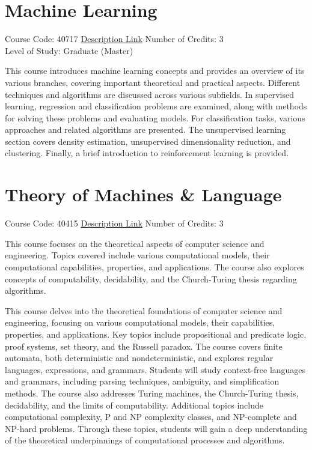 \documentclass[
fontsize=11pt,
paper=a4,
parskip=half,
enlargefirstpage=off,    %
fromalign=right,        %
fromphone=on,           %
fromemail=on,
fromrule=off,           %
addrfield=off,          %
backaddress=on,         %
subject=beforeopening,  %
locfield=narrow,        %
foldmarks=off,          %
open=any
]{scrartcl}
\begin{document}
\section{Machine Learning}
Course Code: 40717 \qquad \quad \href{https://docs.ce.sharif.edu/course/40717}{Description Link}
\qquad \quad Number of Credits: 3
\\Level of Study: Graduate (Master)

This course introduces machine learning concepts and provides an overview of its various branches, covering important theoretical and practical aspects. Different techniques and algorithms are discussed across various subfields. In supervised learning, regression and classification problems are examined, along with methods for solving these problems and evaluating models. For classification tasks, various approaches and related algorithms are presented. The unsupervised learning section covers density estimation, unsupervised dimensionality reduction, and clustering. Finally, a brief introduction to reinforcement learning is provided.

\section{Theory of Machines \& Language}
Course Code: 40415 \qquad \quad \href{https://docs.ce.sharif.edu/course/40415}{Description Link}
\qquad \quad Number of Credits: 3

This course focuses on the theoretical aspects of computer science and engineering. Topics covered include various computational models, their computational capabilities, properties, and applications. The course also explores concepts of computability, decidability, and the Church-Turing thesis regarding algorithms.


This course delves into the theoretical foundations of computer science and engineering, focusing on various computational models, their capabilities, properties, and applications. Key topics include propositional and predicate logic, proof systems, set theory, and the Russell paradox. The course covers finite automata, both deterministic and nondeterministic, and explores regular languages, expressions, and grammars. Students will study context-free languages and grammars, including parsing techniques, ambiguity, and simplification methods. The course also addresses Turing machines, the Church-Turing thesis, decidability, and the limits of computability. Additional topics include computational complexity, P and NP complexity classes, and NP-complete and NP-hard problems. Through these topics, students will gain a deep understanding of the theoretical underpinnings of computational processes and algorithms.
\end{document}
